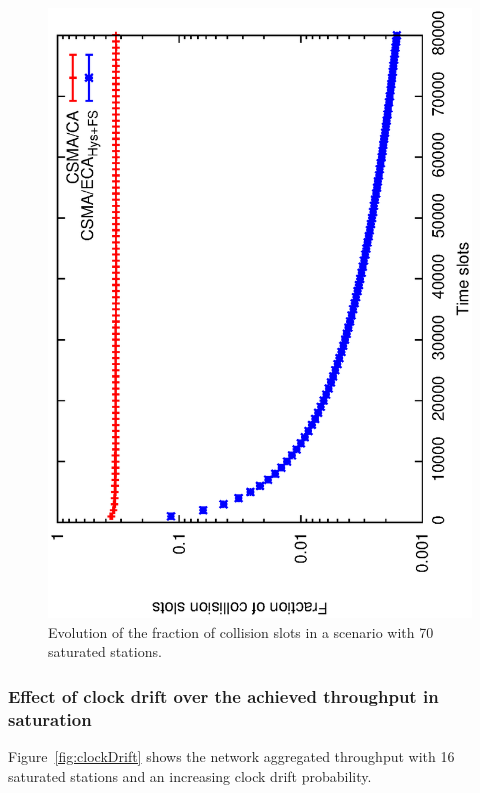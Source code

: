 \documentclass[a4paper,journal]{IEEEtran}
\begin{document}
	\begin{figure}[tb]
	\centering
		\includegraphics[width=0.7\linewidth,angle=-90]{figures/saturated/slots/Pc-evolution.eps}
		\caption{Evolution of the fraction of collision slots in a scenario with 70 saturated stations.}
		\label{fig:collisions-evolution}
	\end{figure}
	
	\subsubsection{Effect of clock drift over the achieved throughput in saturation}\label{performanceClockDrift}
	Figure~\ref{fig:clockDrift} shows the network aggregated throughput with 16 saturated stations and an increasing clock drift probability.
	
\end{document}
